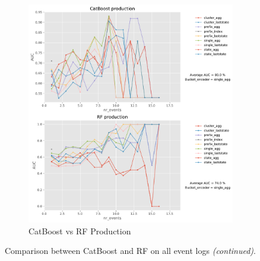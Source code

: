 \documentclass[twoside,11pt]{Latex/Classes/PhDthesisPSnPDF}
\begin{document}
\begin{figure}[t!]
	\begin{subfigure}{0.48\textwidth}
		\includegraphics[width=\linewidth]{images/catboost/graphsrf/production_CatBoost_rf.pdf}
		\caption{CatBoost vs RF Production} \label{fig:procr}
	\end{subfigure}\hspace*{\fill}
\caption{Comparison between CatBoost and RF on all event logs \textit{(continued)}.}
\label{fig:r3cr}
\end{figure}		



\end{document}
